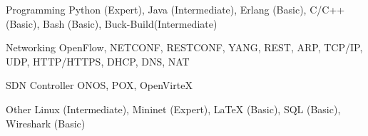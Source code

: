 

\begin{cvskills}

  \cvskill
    {Programming} %
    {Python (Expert), Java (Intermediate), Erlang (Basic), C/C++ (Basic),
      Bash (Basic), Buck-Build(Intermediate)} %

  \cvskill
    {Networking} %
    {OpenFlow, NETCONF, RESTCONF, YANG, REST, ARP, TCP/IP, UDP, HTTP/HTTPS,
      DHCP, DNS, NAT} %

  \cvskill
    {SDN Controller} %
    {ONOS, POX, OpenVirteX} %

  \cvskill
    {Other} %
    {Linux (Intermediate), Mininet (Expert), LaTeX (Basic), SQL (Basic), Wireshark (Basic)} %
\end{cvskills}